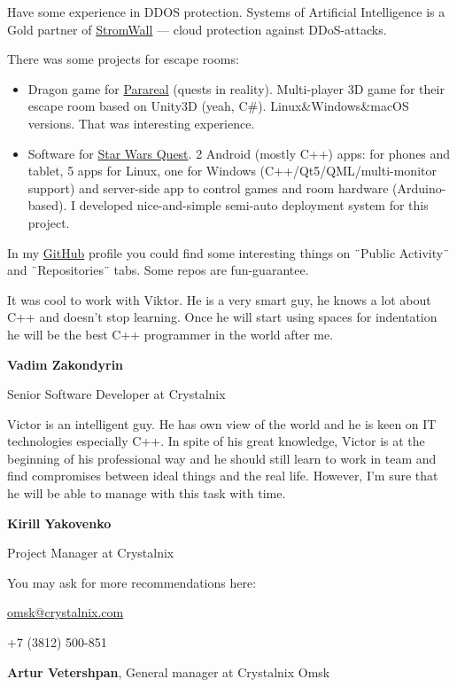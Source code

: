 \documentclass[letterpaper,11pt]{article}
\newlength{\outerbordwidth}
\newcommand{\resheading}[1]{\vspace{5pt}
  \parbox{\textwidth}{\setlength{\FrameSep}{\outerbordwidth}
    \begin{shaded}
\setlength{\fboxsep}{0pt}\framebox[\textwidth][l]{\setlength{\fboxsep}{4pt}\fcolorbox{shadecolorB}{shadecolorB}{\textbf{\sffamily{\mbox{~}\makebox[6.762in][l]{\large #1} \vphantom{p\^{E}}}}}}
    \end{shaded}
  }\vspace{-5pt}
}
\begin{document}
	
	Have some experience in DDOS protection. Systems of Artificial Intelligence is a Gold partner of \href{https://stormwall.pro/en/}{StromWall} --- cloud protection against DDoS-attacks.
	
	There was some projects for escape rooms:
	\begin{itemize}
		\item Dragon game for \href{http://neoskazka.ru/index.html}{Parareal} (quests in reality). Multi-player 3D game for their escape room based on Unity3D (yeah, C\#). Linux\&Windows\&macOS versions. That was interesting experience.
		\item Software for \href{http://starwarsroom.ru/}{Star Wars Quest}. 2 Android (mostly C++) apps: for phones and tablet, 5 apps for Linux, one for Windows (C++/Qt5/QML/multi-monitor support) and server-side app to control games and room hardware (Arduino-based). I developed nice-and-simple semi-auto deployment system for this project.
	\end{itemize}
	
	In my \href{https://github.com/RussianBruteForce}{GitHub} profile you could find some interesting things on ¨Public Activity¨ and ¨Repositories¨ tabs. Some repos are fun-guarantee.

\pagebreak

\resheading{Reviews}

It was cool to work with Viktor. He is a very smart guy, he knows a lot about C++ and doesn't stop learning. Once he will start using spaces for indentation he will be the best C++ programmer in the world after me.

\begin{flushright}
	
\textbf{Vadim Zakondyrin}

Senior Software Developer at Crystalnix
\end{flushright}


Victor is an intelligent guy. He has own view of the world and he is keen on IT technologies especially C++. In spite of his great knowledge, Victor is at the beginning of his professional way and he should still learn to work in team and find compromises between ideal things and the real life. However, I'm sure that he will be able to manage with this task with time.

\begin{flushright}
	
	\textbf{Kirill Yakovenko}
	
	Project Manager at Crystalnix
\end{flushright}


You may ask for more recommendations here:

\href{mailto:omsk@crystalnix.com}{omsk@crystalnix.com}

+7 (3812) 500-851 

\textbf{Artur Vetershpan}, General manager at Crystalnix Omsk
\end{document}
